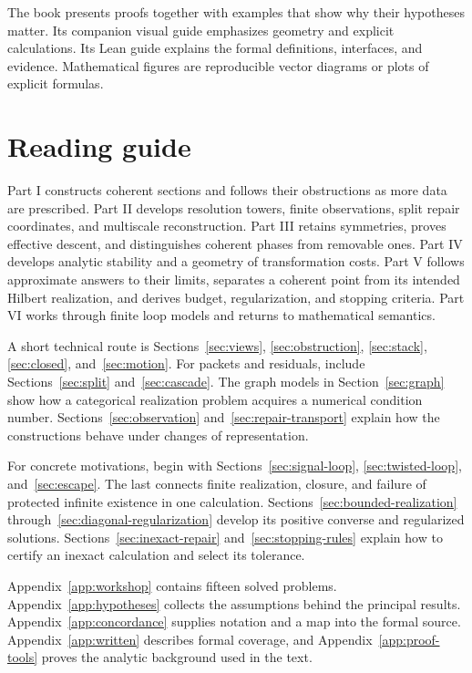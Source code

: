 \documentclass[11pt]{article}
\begin{document}
The book presents proofs together with examples that show why their hypotheses matter. Its companion visual guide emphasizes geometry and explicit calculations. Its Lean guide explains the formal definitions, interfaces, and evidence. Mathematical figures are reproducible vector diagrams or plots of explicit formulas.

\clearpage
\section*{Reading guide}
Part I constructs coherent sections and follows their obstructions as more data are prescribed. Part II develops resolution towers, finite observations, split repair coordinates, and multiscale reconstruction. Part III retains symmetries, proves effective descent, and distinguishes coherent phases from removable ones. Part IV develops analytic stability and a geometry of transformation costs. Part V follows approximate answers to their limits, separates a coherent point from its intended Hilbert realization, and derives budget, regularization, and stopping criteria. Part VI works through finite loop models and returns to mathematical semantics.

A short technical route is Sections~\ref{sec:views}, \ref{sec:obstruction}, \ref{sec:stack}, \ref{sec:closed}, and~\ref{sec:motion}. For packets and residuals, include Sections~\ref{sec:split} and~\ref{sec:cascade}. The graph models in Section~\ref{sec:graph} show how a categorical realization problem acquires a numerical condition number. Sections~\ref{sec:observation} and~\ref{sec:repair-transport} explain how the constructions behave under changes of representation.

For concrete motivations, begin with Sections~\ref{sec:signal-loop}, \ref{sec:twisted-loop}, and~\ref{sec:escape}. The last connects finite realization, closure, and failure of protected infinite existence in one calculation. Sections~\ref{sec:bounded-realization} through~\ref{sec:diagonal-regularization} develop its positive converse and regularized solutions. Sections~\ref{sec:inexact-repair} and~\ref{sec:stopping-rules} explain how to certify an inexact calculation and select its tolerance.

Appendix~\ref{app:workshop} contains fifteen solved problems. Appendix~\ref{app:hypotheses} collects the assumptions behind the principal results. Appendix~\ref{app:concordance} supplies notation and a map into the formal source. Appendix~\ref{app:written} describes formal coverage, and Appendix~\ref{app:proof-tools} proves the analytic background used in the text.
\end{document}
